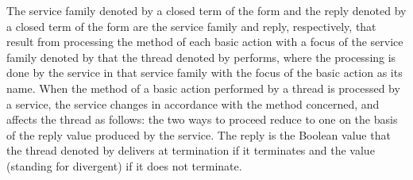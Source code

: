 \documentclass[fleqn]{llncs}
\begin{document}
The service family denoted by a closed term of the form 
and the reply denoted by a closed term of the form  are
the service family and reply, respectively, that result from processing
the method of each basic action with a focus of the service family
denoted by  that the thread denoted by  performs, where the
processing is done by the service in that service family with the focus
of the basic action as its name.
When the method of a basic action performed by a thread is processed by
a service, the service changes in accordance with the method concerned,
and affects the thread as follows: the two ways to proceed reduce to one
on the basis of the reply value produced by the service.
The reply is the Boolean value that the thread denoted by  delivers
at termination if it terminates and the value  (standing for
divergent) if it does not terminate.
\end{document}

